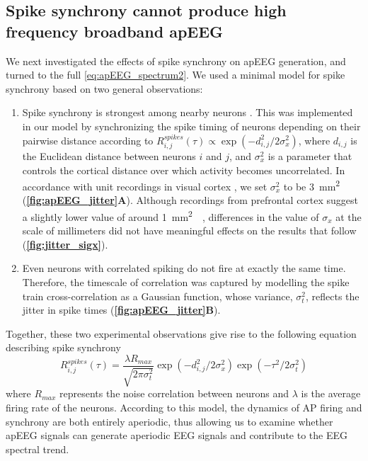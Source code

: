 \subsection{Spike synchrony cannot produce high frequency broadband apEEG}
We next investigated the effects of spike synchrony on apEEG generation, and turned to the full \ref{eq:apEEG_spectrum2}. We used a minimal model for spike synchrony based on two general observations:
\begin{enumerate}
\item Spike synchrony is strongest among nearby neurons \cite{Smith2008, Smith2013, Cohen2011}. This was implemented in our model by synchronizing the spike timing of neurons depending on their pairwise distance according to $R^{spikes}_{i,j}(\tau) \propto \exp(-d_{i,j}^2 / 2\sigma_x^2)$, where $d_{i,j}$ is the Euclidean distance between neurons $i$ and $j$, and $\sigma_x^2$ is a parameter that controls the cortical distance over which activity becomes uncorrelated. In accordance with unit recordings in visual cortex \cite{Smith2008, Smith2013}, we set $\sigma_x^2$ to be 3~\unit{\milli\meter^2}  (\textbf{\autoref{fig:apEEG_jitter}A}). Although recordings from prefrontal cortex suggest a slightly lower value of around 1~\unit{\milli\meter^2}~~\cite{Constantinidis2002},  differences in the value of $\sigma_x$ at the scale of millimeters did not have meaningful effects on the results that follow (\textbf{\autoref{fig:jitter_sigx}}).
\item Even neurons with correlated spiking do not fire at exactly the same time. Therefore, the timescale of correlation was captured by modelling the spike train cross-correlation as a Gaussian function, whose variance, $\sigma_t^2$, reflects the jitter in spike times  \cite{Bair2001, Smith2008, Smith2013, Cohen2011} (\textbf{\autoref{fig:apEEG_jitter}B}). 
\end{enumerate}
Together, these two experimental observations give rise to the following equation describing spike synchrony
\begin{equation} \label{eq:aperiodic_cross_correlation}
    R^{spikes}_{i,j}(\tau) = \frac{\lambda R_{max}}{\sqrt{2\pi \sigma_t^2}} \exp(-d_{i,j}^2 / 2\sigma_x^2) \exp(-\tau^2/2\sigma_t^2)
\end{equation} 
where $R_{max}$ represents the noise correlation between neurons \cite{Bair2001} and $\lambda$ is the average firing rate of the neurons. According to this model, the dynamics of AP firing and synchrony are both entirely aperiodic, thus allowing us to examine whether apEEG signals can generate aperiodic EEG signals and contribute to the EEG spectral trend.

